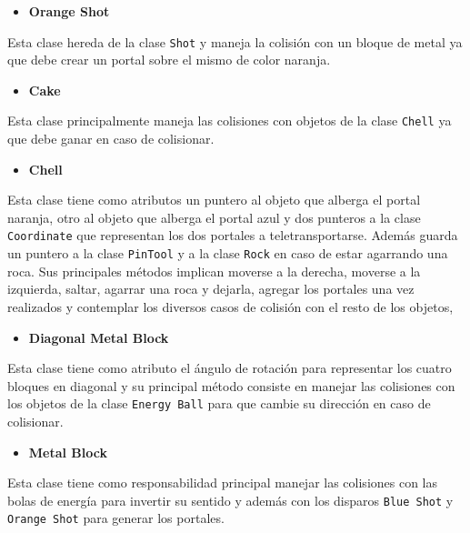 \documentclass[a4paper]{article}
\begin{document}
\begin{itemize}
	\item \textbf{Orange Shot}
\end{itemize}

Esta clase hereda de la clase \texttt{Shot} y maneja la colisión con un bloque de metal ya que debe crear un portal sobre el mismo de color naranja.

\begin{itemize}
	\item \textbf{Cake}
\end{itemize}

Esta clase principalmente maneja las colisiones con objetos de la clase \texttt{Chell} ya que debe ganar en caso de colisionar.

\begin{itemize}
	\item \textbf{Chell}
\end{itemize}

Esta clase tiene como atributos un puntero al objeto que alberga el portal naranja, otro al objeto que alberga el portal azul y dos punteros a la clase \texttt{Coordinate} que representan los dos portales a teletransportarse. Además guarda un puntero a la clase \texttt{PinTool} y a la clase \texttt{Rock} en caso de estar agarrando una roca. Sus principales métodos implican moverse a la derecha, moverse a la izquierda, saltar, agarrar una roca y dejarla, agregar los portales una vez realizados y contemplar los diversos casos de colisión con el resto de los objetos,

\begin{itemize}
	\item \textbf{Diagonal Metal Block}
\end{itemize}

Esta clase tiene como atributo el ángulo de rotación para representar los cuatro bloques en diagonal y su principal método consiste en manejar las colisiones con los objetos de la clase \texttt{Energy Ball} para que cambie su dirección en caso de colisionar.

\begin{itemize}
	\item \textbf{Metal Block}
\end{itemize}

Esta clase tiene como responsabilidad principal manejar las colisiones con las bolas de energía para invertir su sentido y además con los disparos \texttt{Blue Shot} y \texttt{Orange Shot} para generar los portales.
\end{document}
